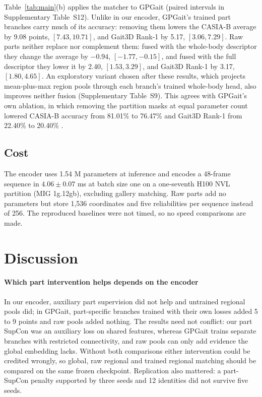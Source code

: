 \documentclass[review,12pt]{elsarticle}
\begin{document}
Table~\ref{tab:main}(b) applies the matcher to GPGait (paired intervals in
Supplementary Table~S12). Unlike in our encoder, GPGait's trained part branches
carry much of its accuracy: removing them lowers the CASIA-B average by 9.08
points, $[7.43,10.71]$, and Gait3D Rank-1 by 5.17, $[3.06,7.29]$. Raw parts
neither replace nor complement them: fused with the whole-body descriptor they
change the average by $-0.94$, $[-1.77,-0.15]$, and fused with the full
descriptor they lower it by 2.40, $[1.53,3.29]$, and Gait3D Rank-1 by 3.17,
$[1.80,4.65]$. An exploratory variant chosen after these results, which projects
mean-plus-max region pools through each branch's trained whole-body head, also
improves neither fusion (Supplementary Table~S9). This agrees with GPGait's own
ablation, in which removing the partition masks at equal parameter count
lowered CASIA-B accuracy from 81.01\% to 76.47\% and Gait3D Rank-1 from 22.40\%
to 20.40\% \cite{fu2023gpgait}.

\subsection{Cost}

The encoder uses 1.54 M parameters at inference and encodes a 48-frame sequence
in $4.06\pm0.07$ ms at batch size one on a one-seventh H100 NVL partition (MIG
1g.12gb), excluding gallery matching. Raw parts add no parameters but store
1,536 coordinates and five reliabilities per sequence instead of 256. The
reproduced baselines were not timed, so no speed comparisons are made.

\section{Discussion}
\label{sec:discussion}

\paragraph{Which part intervention helps depends on the encoder}
In our encoder, auxiliary part supervision did not help and untrained regional
pools did; in GPGait, part-specific branches trained with their own losses
added 5 to 9 points and raw pools added nothing. The results need not conflict:
our part SupCon was an auxiliary loss on shared features, whereas GPGait trains
separate branches with restricted connectivity, and raw pools can only add
evidence the global embedding lacks. Without both comparisons either intervention
could be credited wrongly, so global, raw regional and trained regional matching
should be compared on the same frozen checkpoint. Replication also mattered: a
part-SupCon penalty supported by three seeds and 12 identities did not survive
five seeds.
\end{document}
